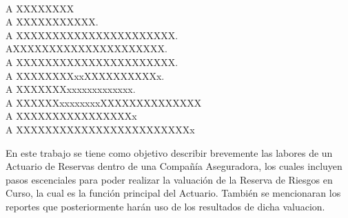 \documentclass[11pt,twoside,openright,spanish]{report}
\numberwithin{equation}{chapter}
\numberwithin{figure}{chapter}
\numberwithin{table}{chapter}
\begin{document}
	\newpage
	$\ $
	\thispagestyle{empty} %
	
	\begin{acknowledgements}
	 
	A XXXXXXXX
	\\

	A XXXXXXXXXXX.
	\\
	
	A XXXXXXXXXXXXXXXXXXXXXX.
	\\
	
	AXXXXXXXXXXXXXXXXXXXXX.
	\\
	
	A XXXXXXXXXXXXXXXXXXXXXX.
	\\
	
	A XXXXXXXXxxXXXXXXXXXXx.
	\\
	
	A XXXXXXXxxxxxxxxxxxxx.   
	\\
	
	A XXXXXXxxxxxxxxXXXXXXXXXXXXXX
	\\
	
	A XXXXXXXXXXXXXXXXx
	\\
	
	A XXXXXXXXXXXXXXXXXXXXXXXXx
	\\
	
		
	\end{acknowledgements}
	
	
	\tableofcontents
	
	
	\addtolength{\headheight}{\baselineskip}
	\pagestyle{fancy}
	\cleardoublepage
		
	\begin{preface}
	\doublespacing
	
	En este trabajo se tiene como objetivo describir brevemente las labores de un Actuario de Reservas dentro de una Compañía Aseguradora, los cuales incluyen pasos escenciales para poder realizar la valuación de la Reserva de Riesgos en Curso, la cual es la función principal del Actuario. También se mencionaran los reportes que posteriormente harán uso de los resultados de dicha valuacion.
		
	\end{preface}
	
\end{document}
